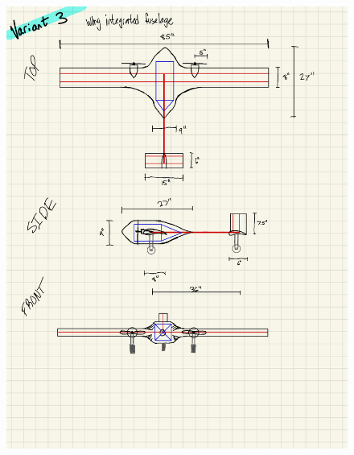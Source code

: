 \begin{figure}[htpb]
    \centering
    \includegraphics[width=0.9\linewidth]{Figures/aircraft_sketch_03.pdf}
    \caption[Concept sketch variant 3]{}
    \label{fig:sketch_03}
\end{figure}
